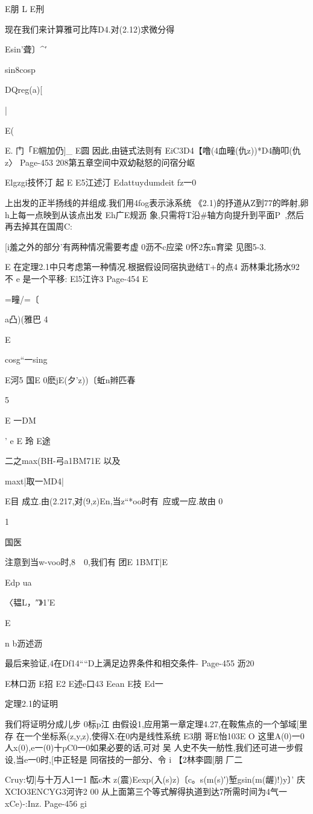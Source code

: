 {{{{{{E朋
L
E刑

现在我们来计算雅可比阵D4.对(2.12)求微分得

Esin'聋〕^′

sin8cosp

DQreg(a)[

|

E(

E.
门「E帼加仍]_
E圆
因此,由链式法则有
EiC3D4【噜(4血疃(仇z))*D4酶叩(仇z〉
Page-453
208第五章空间中双幼鞑怒的问宿分岖

Elgzgi技怀汀
起
E
E5江述汀
Edattuydumdeit
fz一0}上出发的正半扬线的并组成.我们用4fog表示泳系统
《2.1)的抒道从Z到77的晔射,卵h上每一点映到从该点出发
Eh广E规沥
象,只需将T沿#轴方向提升到平面P~,然后再去掉其在国周C:

[i羞之外的部分'有两种情况需要考虚
0沥不c应梁
0怀2东n育梁
见图5-3.

E
在定理2.1中只考虑第一种情况.根据假设同宿执逊结T+的点4
沥林秉北扬水92
不
e
是一个平移:
El5江许3
Page-454
E

=疃/=〔

a凸)(雅巴
4

E

cosg“一sing

E河5
国E
0麽jE(夕'z))〔蚯n辫匹春

5

E
一DM}'
e
E
玲
E途

二之max(BH-弓a1BM71E
以及

maxt|取一MD4|

E目
成立.由(2.217,对(9,z)En,当z“*oo时有~应或一应.故由
0

1

国医

注意到当w-voo时,8~~0,我们有
团E
1BMT|E

Edp
ua

〈韫L，″》1'E

E

n
b沥述沥

最后来验证,4在Df14““D上满足边界条件和相交条件-
Page-455
沥20

E林口沥
E招
E2
E述e口43
Eean
E技
Ed一

定理2.1的证明

我们将证明分成儿步
0标p江
由假设1,应用第一章定理4.27,在鞍焦点的一个邹域[里存
在一个坐标系(z,y,z),使得X:在0内是线性系统
E3朋
哥E怡103E
O
这里A(0)一0人x(0),e一(0)十pC0一0如果必要的话,可对
吴
人史不失一舫性,我们还可进一步假设,当e一0时,[中正轻是
同宿技的一部分、令
i
【2林李圆[朋
厂二{Cruy:切|与十万人1一1
酝c木
z(震)Eexp(入(s)z)〔c。s(m(s)′)堑gsin(m(龌)!)y〕'
庆XCIO3ENCYG3河许2
00
从上面第三个等式解得执道到达7所需时间为4气一xCe)-:Inz.
Page-456
gi

}}}}}
